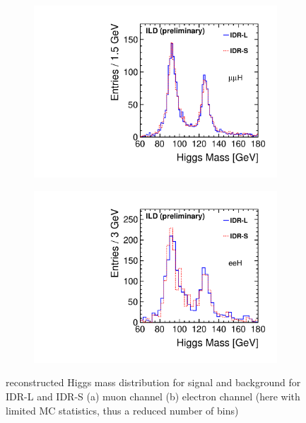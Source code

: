 \begin{figure}[htbp]
\begin{subfigure}{0.49\hsize} \includegraphics[width=\textwidth]{Performance/fig/mH_e2e2h_bb_eLpR_IDR.pdf}
 \caption{ \label{fig:mh:mass:mumu}}
 \end{subfigure}
\begin{subfigure}{0.49\hsize} \includegraphics[width=\textwidth]{Performance/fig/mH_e1e1h_bb_eLpR_IDR.pdf}
 \caption{  \label{fig:mh:mass:ee}}
 \end{subfigure}
\caption{reconstructed Higgs mass distribution for signal and background for IDR-L and IDR-S
(a) muon channel
(b) electron channel (here with limited MC statistics, thus a reduced number of bins)
}
\label{fig:mh:mass}
\end{figure}


